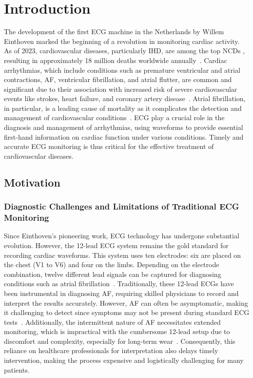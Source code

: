 
\chapter{Introduction}
\label{chap:introduction}

The development of the first ECG machine in the Netherlands by Willem Einthoven marked the beginning of a revolution in monitoring cardiac activity. As of 2023, cardiovascular diseases, particularly \ac{IHD}, are among the top \ac{NCDs} , resulting in approximately 18 million deaths worldwide annually~\cite{who2023}. Cardiac arrhythmias, which include conditions such as premature ventricular and atrial contractions, \ac{AF}, ventricular fibrillation, and atrial flutter, are common and significant due to their association with increased risk of severe cardiovascular events like strokes, heart failure, and coronary artery disease~\cite{sharma2018, liu2021}. Atrial fibrillation, in particular, is a leading cause of mortality as it complicates the detection and management of cardiovascular conditions~\cite{liu2021}. \ac{ECG} play a crucial role in the diagnosis and management of arrhythmias, using waveforms to provide essential first-hand information on cardiac function under various conditions. Timely and accurate ECG monitoring is thus critical for the effective treatment of cardiovascular diseases.

\section{Motivation}

\subsection{Diagnostic Challenges and Limitations of Traditional ECG Monitoring}

Since Einthoven's pioneering work, ECG technology has undergone substantial evolution. However, the 12-lead ECG system remains the gold standard for recording cardiac waveforms. This system uses ten electrodes: six are placed on the chest (V1 to V6) and four on the limbs. Depending on the electrode combination, twelve different lead signals can be captured for diagnosing conditions such as atrial fibrillation~\cite{liu2021}. Traditionally, these 12-lead ECGs have been instrumental in diagnosing AF, requiring skilled physicians to record and interpret the results accurately. However, AF can often be asymptomatic, making it challenging to detect since symptoms may not be present during standard ECG tests~\cite{page2003}. Additionally, the intermittent nature of AF necessitates extended monitoring, which is impractical with the cumbersome 12-lead setup due to discomfort and complexity, especially for long-term wear~\cite{liu2021}. Consequently, this reliance on healthcare professionals for interpretation also delays timely intervention, making the process expensive and logistically challenging for many patients.

